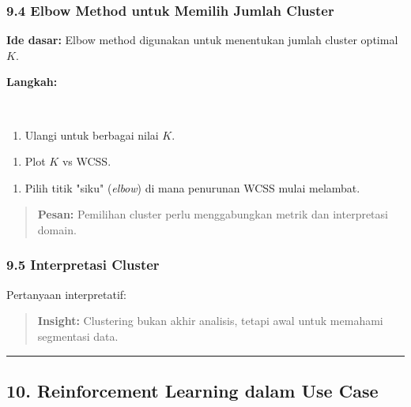 \documentclass[12pt,a4paper]{article}
\begin{document}
\subsubsection{9.4 Elbow Method untuk Memilih Jumlah Cluster}

\textbf{Ide dasar:} Elbow method digunakan untuk menentukan jumlah cluster optimal $K$.


\textbf{Langkah:}


\\[
\begin{tabular}{|l|l|l|}
\hline
\text{WCSS} = \sum_{k=1}^{K} \sum_{x_i \in C_k} \ & x_i - \mu_k\ & ^2 \\
\hline
\end{tabular}
\\]


\begin{enumerate}
\item Ulangi untuk berbagai nilai $K$.
\end{enumerate}

\begin{enumerate}
\item Plot $K$ vs WCSS.
\end{enumerate}

\begin{enumerate}
\item Pilih titik "siku" (\emph{elbow}) di mana penurunan WCSS mulai melambat.
\end{enumerate}


\begin{quote}
\textbf{Pesan:} Pemilihan cluster perlu menggabungkan metrik dan interpretasi domain.\end{quote}


\subsubsection{9.5 Interpretasi Cluster}

Pertanyaan interpretatif:


\begin{quote}
\textbf{Insight:} Clustering bukan akhir analisis, tetapi awal untuk memahami segmentasi data.\end{quote}


\hrule


\subsection{10. Reinforcement Learning dalam Use Case}
\end{document}
